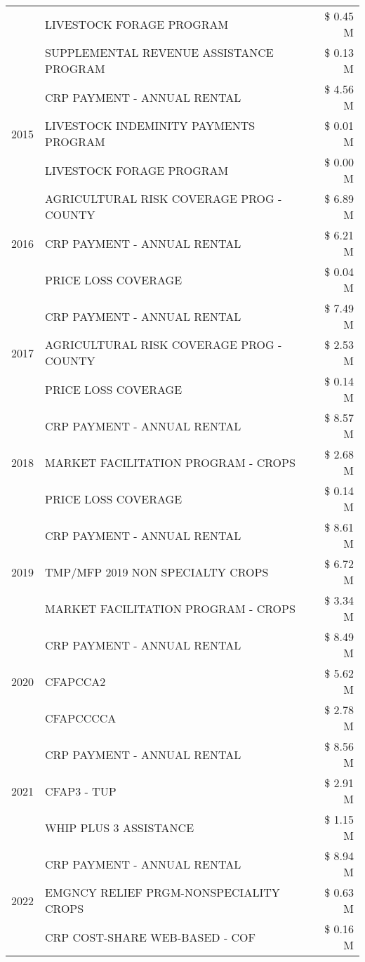 \begin{tabular}{llr}
 & LIVESTOCK FORAGE PROGRAM & \$ 0.45 M \\
 & SUPPLEMENTAL REVENUE ASSISTANCE PROGRAM & \$ 0.13 M \\
\cline{1-3}
\multirow[t]{3}{*}{2015} & CRP PAYMENT - ANNUAL RENTAL & \$ 4.56 M \\
 & LIVESTOCK INDEMINITY PAYMENTS PROGRAM & \$ 0.01 M \\
 & LIVESTOCK FORAGE PROGRAM & \$ 0.00 M \\
\cline{1-3}
\multirow[t]{3}{*}{2016} & AGRICULTURAL RISK COVERAGE PROG - COUNTY & \$ 6.89 M \\
 & CRP PAYMENT - ANNUAL RENTAL & \$ 6.21 M \\
 & PRICE LOSS COVERAGE & \$ 0.04 M \\
\cline{1-3}
\multirow[t]{3}{*}{2017} & CRP PAYMENT - ANNUAL RENTAL & \$ 7.49 M \\
 & AGRICULTURAL RISK COVERAGE PROG - COUNTY & \$ 2.53 M \\
 & PRICE LOSS COVERAGE & \$ 0.14 M \\
\cline{1-3}
\multirow[t]{3}{*}{2018} & CRP PAYMENT - ANNUAL RENTAL & \$ 8.57 M \\
 & MARKET FACILITATION PROGRAM - CROPS & \$ 2.68 M \\
 & PRICE LOSS COVERAGE & \$ 0.14 M \\
\cline{1-3}
\multirow[t]{3}{*}{2019} & CRP PAYMENT - ANNUAL RENTAL & \$ 8.61 M \\
 & TMP/MFP 2019 NON SPECIALTY CROPS & \$ 6.72 M \\
 & MARKET FACILITATION PROGRAM - CROPS & \$ 3.34 M \\
\cline{1-3}
\multirow[t]{3}{*}{2020} & CRP PAYMENT - ANNUAL RENTAL & \$ 8.49 M \\
 & CFAPCCA2 & \$ 5.62 M \\
 & CFAPCCCCA & \$ 2.78 M \\
\cline{1-3}
\multirow[t]{3}{*}{2021} & CRP PAYMENT - ANNUAL RENTAL & \$ 8.56 M \\
 & CFAP3 - TUP & \$ 2.91 M \\
 & WHIP PLUS 3 ASSISTANCE & \$ 1.15 M \\
\cline{1-3}
\multirow[t]{3}{*}{2022} & CRP PAYMENT - ANNUAL RENTAL & \$ 8.94 M \\
 & EMGNCY RELIEF PRGM-NONSPECIALITY CROPS & \$ 0.63 M \\
 & CRP COST-SHARE WEB-BASED - COF & \$ 0.16 M \\
\cline{1-3}
\bottomrule
\end{tabular}
